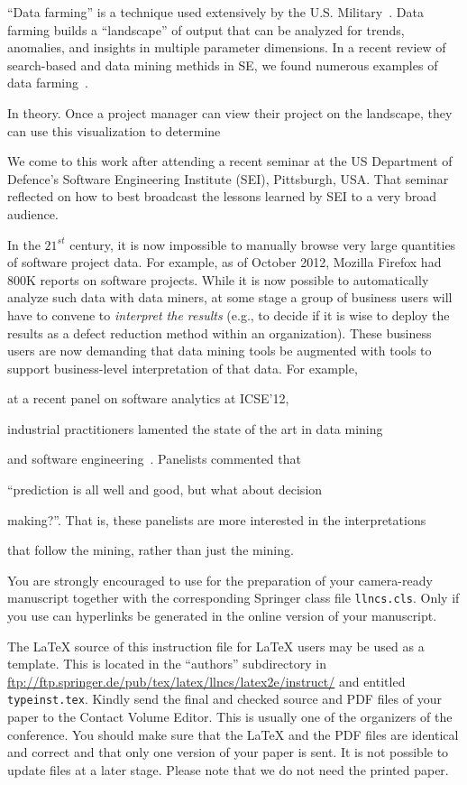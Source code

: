 \documentclass[runningheads]{llncs}
\begin{document}
``Data farming'' is a technique used extensively by the
U.S. Military~\cite{meyer04}.
Data farming builds a ``landscape''
of output that can be analyzed for trends, anomalies, and insights in
multiple parameter dimensions.  
In  a recent review of search-based and data mining methids in SE,
we found numerous examples
of data farming~\cite{strickland03,Myrtveit,Shepperd01,pearce99,vanlamsweerde98integrating,chung00,me03j,heaven11,rodriguez11,jian09}.

In theory. Once a project manager can view their project on the landscape,
they can use this visualization to determine

We come to this work after attending a recent seminar at the US 
Department of Defence's Software Engineering Institute (SEI), Pittsburgh, USA.
That seminar reflected on how to best broadcast the lessons learned by SEI
to a very broad audience.

In the $21^{st}$ century, it is now impossible to manually browse very
large quantities of software project data.
For example, as of October 2012,
Mozilla Firefox had 800K reports on software projects.  While it is
now possible to automatically analyze such data with data miners, at
some stage a group of business users will have to convene to {\em
  interpret the results} (e.g., to decide if it is wise to deploy the
results as a defect reduction method within an organization).
These business  users are now demanding that data mining tools
be augmented with tools to support  business-level
interpretation of that data. For example,

at a recent panel on software analytics at ICSE'12,

industrial practitioners lamented the state of the art in data mining

and software engineering~\cite{menzies12a}. Panelists commented that

``prediction is all well and good, but what about decision

making?''. That is, these panelists are more interested in the interpretations

that follow the mining, rather than just  the mining.


You are strongly encouraged to use \LaTeXe{} for the
preparation of your camera-ready manuscript together with the
corresponding Springer class file \verb+llncs.cls+. Only if you use
\LaTeXe{} can hyperlinks be generated in the online version
of your manuscript.

The \LaTeX{} source of this instruction file for \LaTeX{} users may be used as
a template. This is located in the ``authors'' subdirectory in
\url{ftp://ftp.springer.de/pub/tex/latex/llncs/latex2e/instruct/} and
entitled \texttt{typeinst.tex}. Kindly
send the final and checked source and PDF files of your paper to the
Contact Volume Editor. This is usually one of the organizers of the
conference. You should make sure that the \LaTeX{} and the PDF files are
identical and correct and that only one version of your paper is sent.
It is not possible to update files at a later stage. Please note that we
do not need the printed paper.
\end{document}
